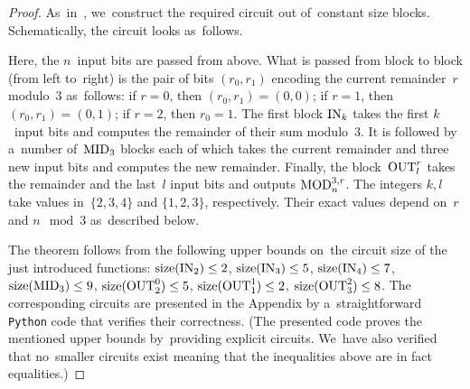 \begin{proof}
As~in~\cite{DBLP:conf/sat/KojevnikovKY09},
we~construct the required circuit out of~constant size blocks. Schematically, the circuit looks as~follows.

\begin{center}
\end{center}
%
Here, the $n$~input bits are passed from above.
What is passed from block to block (from left to~right)
is the pair of bits $(r_0, r_1)$ encoding the current remainder~$r$ modulo~$3$ as~follows: if $r=0$, then $(r_0,r_1)=(0,0)$; if $r=1$, then $(r_0,r_1)=(0,1)$; if $r=2$, then $r_0=1$. The first block $\operatorname{IN}_k$ takes the first $k$~input bits and computes the remainder of their sum modulo~$3$. It is followed by a~number of~$\operatorname{MID}_3$ blocks each of which takes the current remainder and three new input bits and computes the new remainder. Finally, the block~$\operatorname{OUT}_l^r$ takes the remainder and the last~$l$ input bits and outputs $\operatorname{MOD}_n^{3,r}$. The integers $k,l$ take values in~$\{2,3,4\}$ and $\{1,2,3\}$, respectively. Their exact values depend on~$r$ and $n \mod 3$ as~described below.

The theorem follows from the following upper bounds
on~the circuit size of the just introduced functions:
$\operatorname{size}(\operatorname{IN}_2) \le 2$,
$\operatorname{size}(\operatorname{IN}_3) \le 5$,
$\operatorname{size}(\operatorname{IN}_4) \le 7$,
$\operatorname{size}(\operatorname{MID}_3) \le 9$,
$\operatorname{size}(\operatorname{OUT}_2^0) \le 5$,
$\operatorname{size}(\operatorname{OUT}_1^1) \le 2$,
$\operatorname{size}(\operatorname{OUT}_3^2) \le 8$.
The corresponding circuits are presented in the Appendix
by a~straightforward \texttt{Python} code that verifies their correctness. (The presented code proves the mentioned upper bounds by~providing explicit circuits. We~have also verified that no~smaller circuits exist meaning that the
inequalities above are in fact equalities.)


\end{proof}
